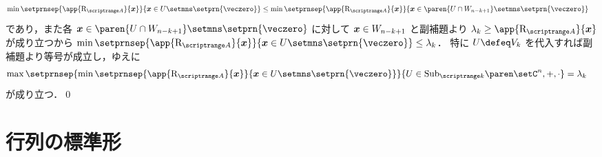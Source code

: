 \documentclass[a4paper]{jsarticle}
\begin{document}
{\begin{align*}
        \min \setprnsep{\app{\Rayleigh{A}}{\vecx}}{\vecx \in U \setmns \setprn{\veczero}}
        &\leq \min \setprnsep{\app{\Rayleigh{A}}{\vecx}}{\vecx \in \paren{U \cap W_{n - k + 1}} \setmns \setprn{\veczero}}
      \end{align*}
      であり，また各 $\vecx \in \paren{U \cap W_{n - k + 1}} \setmns \setprn{\veczero}$ に対して
      $\bm{x} \in W_{n - k + 1}$ と副補題より $\lambda_{k} \geq \app{\Rayleigh{A}}{\vecx}$ が成り立つから
      $\min \setprnsep{\app{\Rayleigh{A}}{\vecx}}{\vecx \in U \setmns \setprn{\veczero}} \leq \lambda_{k}$．
      特に $U \defeq V_{k}$ を代入すれば副補題より等号が成立し，ゆえに
      \begin{align*}
        \max \setprnsep{\min \setprnsep{\app{\Rayleigh{A}}{\vecx}}{\vecx \in U \setmns \setprn{\veczero}}}{
          U \in \subspaceof{k}{\setC^{n}, +, \cdot}}
        &= \lambda_{k}
      \end{align*}
      が成り立つ．\qed
    }
\section{行列の標準形}
\end{document}
